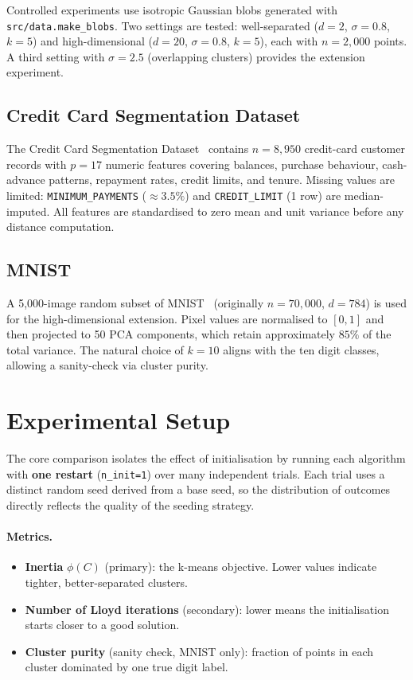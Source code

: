 \documentclass[11pt,a4paper]{article}
\newcommand{\phiC}{\phi(C)}
\begin{document}
Controlled experiments use isotropic Gaussian blobs generated with
\texttt{src/data.make\_blobs}.
Two settings are tested: well-separated ($d=2$, $\sigma=0.8$, $k=5$)
and high-dimensional ($d=20$, $\sigma=0.8$, $k=5$), each with $n=2{,}000$
points.
A third setting with $\sigma=2.5$ (overlapping clusters) provides the
extension experiment.

\subsection{Credit Card Segmentation Dataset}

The Credit Card Segmentation Dataset~\cite{ccgeneral} contains $n=8{,}950$ credit-card
customer records with $p=17$ numeric features covering balances, purchase
behaviour, cash-advance patterns, repayment rates, credit limits, and tenure.
Missing values are limited: \texttt{MINIMUM\_PAYMENTS} (${\approx}3.5\%$)
and \texttt{CREDIT\_LIMIT} (1 row) are median-imputed.
All features are standardised to zero mean and unit variance before any
distance computation.

\subsection{MNIST}

A 5{,}000-image random subset of MNIST~\cite{lecun1998mnist} (originally
$n=70{,}000$, $d=784$) is used for the high-dimensional extension.
Pixel values are normalised to $[0,1]$ and then projected to 50 PCA
components, which retain approximately $85\%$ of the total variance.
The natural choice of $k=10$ aligns with the ten digit classes, allowing
a sanity-check via cluster purity.

\section{Experimental Setup}

The core comparison isolates the effect of initialisation by running each
algorithm with \textbf{one restart} (\texttt{n\_init=1}) over many
independent trials.
Each trial uses a distinct random seed derived from a base seed, so the
distribution of outcomes directly reflects the quality of the seeding
strategy.

\paragraph{Metrics.}
\begin{itemize}
  \item \textbf{Inertia} $\phiC$ (primary): the k-means objective.
    Lower values indicate tighter, better-separated clusters.
  \item \textbf{Number of Lloyd iterations} (secondary): lower means the
    initialisation starts closer to a good solution.
  \item \textbf{Cluster purity} (sanity check, MNIST only): fraction of
    points in each cluster dominated by one true digit label.
\end{itemize}
\end{document}
